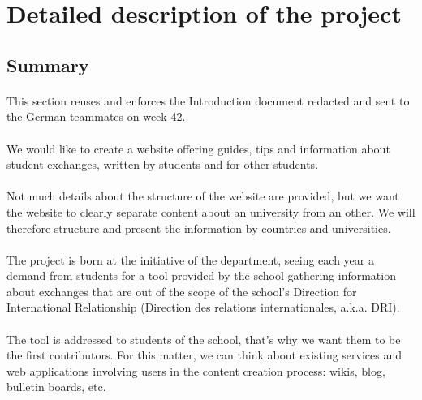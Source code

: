 \section{Detailed description of the project}

\subsection{Summary}

\paragraph{} This section reuses and enforces the Introduction document redacted
and sent to the German teammates on week 42.

\paragraph{} We would like to create a website offering guides, tips and
information about student exchanges, written by students and for other
students.

\paragraph{} Not much details about the structure of the website are provided,
but we want the website to clearly separate content about an university from
an other. We will therefore structure and present the information by countries
and universities.

\paragraph{} The project is born at the initiative of the department, seeing
each year a demand from students for a tool provided by the school gathering
information about exchanges that are out of the scope of the school's
Direction for International Relationship (Direction des relations
internationales, a.k.a. DRI).

\paragraph{} The tool is addressed to students of the school, that's why we want
them to be the first contributors. For this matter, we can think about existing
services and web applications involving users in the content creation process:
wikis, blog, bulletin boards, etc.

